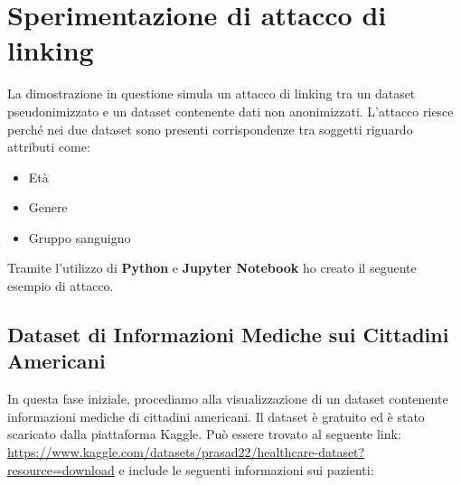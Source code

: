 

\chapter{Sperimentazione di attacco di linking}

La dimostrazione in questione simula un attacco di linking tra un dataset pseudonimizzato e un dataset contenente dati non anonimizzati. L'attacco riesce perché nei due dataset sono presenti corrispondenze tra soggetti riguardo attributi come:

\begin{itemize}
  \item Età
  \item Genere
  \item Gruppo sanguigno
\end{itemize}

Tramite l'utilizzo di \textbf{Python} e \textbf{Jupyter Notebook} ho creato il seguente esempio di attacco.

\newpage

\section{Dataset di Informazioni Mediche sui Cittadini Americani}

In questa fase iniziale, procediamo alla visualizzazione di un dataset contenente informazioni mediche di cittadini americani. Il dataset è gratuito ed è stato scaricato dalla piattaforma Kaggle. Può essere trovato al seguente link: \href{https://www.kaggle.com/datasets/prasad22/healthcare-dataset?resource=download}{https://www.kaggle.com/datasets/prasad22/healthcare-dataset?resource=download} e include le seguenti informazioni sui pazienti:

